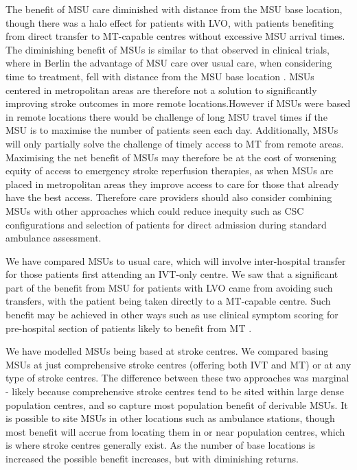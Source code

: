 The benefit of MSU care diminished with distance from the MSU base location, though there was a halo effect for patients with LVO, with patients benefiting from direct transfer to MT-capable centres without excessive MSU arrival times. The diminishing benefit of MSUs is similar to that observed in clinical trials, where in Berlin the advantage of MSU care over usual care, when considering time to treatment, fell with distance from the MSU base location \cite{koch_influence_2016}. MSUs centered in metropolitan areas are therefore not a solution to significantly improving stroke outcomes in more remote locations.However if MSUs were based in remote locations there would be challenge of long MSU travel times if the MSU is to maximise the number of patients seen each day. Additionally, MSUs will only partially solve the challenge of timely access to MT from remote areas. Maximising the net benefit of MSUs may therefore be at the cost of worsening equity of access to emergency stroke reperfusion therapies, as when MSUs are placed in metropolitan areas they improve access to care for those that already have the best access. Therefore care providers should also consider combining MSUs with other approaches which could reduce inequity such as CSC configurations and selection of patients for direct admission during standard ambulance assessment. 

We have compared MSUs to usual care, which will involve inter-hospital transfer for those patients first attending an IVT-only centre. We saw that a significant part of the benefit from MSU for patients with LVO came from avoiding such transfers, with the patient being taken directly to a MT-capable centre. Such benefit may be achieved in other ways such as use clinical symptom scoring for pre-hospital section of patients likely to benefit from MT \cite{perez_de_la_ossa_effect_2022} .

We have modelled MSUs being based at stroke centres. We compared basing MSUs at just comprehensive stroke centres (offering both IVT and MT) or at any type of stroke centres. The difference between these two approaches was marginal - likely because comprehensive stroke centres tend to be sited within large dense population centres, and so capture most population benefit of derivable MSUs. It is possible to site MSUs in other locations such as ambulance stations, though most benefit will accrue from locating them in or near population centres, which is where stroke centres generally exist. As the number of base locations is increased the possible benefit increases, but with diminishing returns. 

